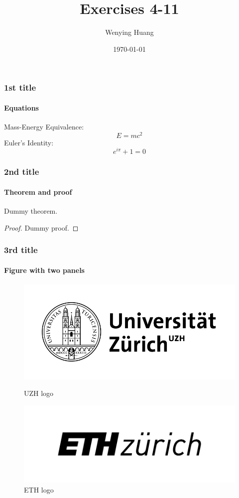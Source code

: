 \documentclass[10pt]{beamer}
\title{Exercises 4-11}
\author{Wenying Huang}
\institute{University of Zurich}
\date{\today}
\begin{document}
\frame{\titlepage}

\begin{frame}
\frametitle{1st title}
\framesubtitle{Equations}
Mass-Energy Equivalence:
\begin{equation}
E=mc^2
\end{equation}
Euler's Identity:
\begin{equation}
e^{i\pi}+1=0
\end{equation}
\end{frame}

\begin{frame}
\frametitle{2nd title}
\framesubtitle{Theorem and proof}
\begin{theorem}
Dummy theorem.
\end{theorem}
\begin{proof}
Dummy proof.
\end{proof}
\end{frame}

\begin{frame}
\frametitle{3rd title}
\framesubtitle{Figure with two panels}
\begin{figure}
\centering
\begin{minipage}[b]{0.45\textwidth}
\includegraphics[width=\linewidth]{UZH-logo.png}
\caption{UZH logo}
\end{minipage}
\begin{minipage}[b]{0.45\textwidth}
\includegraphics[width=\linewidth]{ETH-logo.png}
\caption{ETH logo}
\end{minipage}
\end{figure}
\end{frame}
\end{document}
